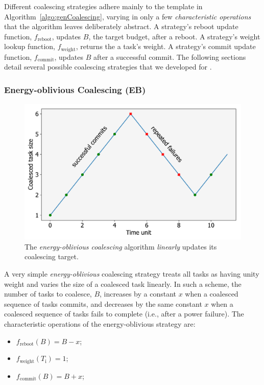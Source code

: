 Different coalescing strategies adhere mainly to the template in
Algorithm~\ref{algo:genCoalescing}, varying in only a few {\em characteristic
operations} that the algorithm leaves deliberately abstract.  A strategy's
reboot update function, $f_\text{reboot}$, updates $B$, the target budget,
after a reboot. A strategy's weight lookup function, $f_\text{weight}$, returns
the a task's weight.  A strategy's commit update function, $f_\text{commit}$,
updates $B$ after a successful commit. The following sections detail several
possible coalescing strategies that we developed for \sys. 

\subsubsection{Energy-oblivious Coalescing (EB)}
\label{subsec:energyBlind}

\begin{figure}
	\centering
	\includegraphics[width=0.5\columnwidth]{figures/slowCoal}
	\caption{The {\em energy-oblivious coalescing} algorithm \emph{linearly} updates its coalescing target.}
	\label{fig:energyBlind}
\end{figure}

A very simple {\em energy-oblivious} coalescing strategy treats all tasks as
having unity weight and varies the size of a coalesced task linearly. In such a
scheme, the number of tasks to coalesce, $B$, increases by a constant $x$ when
a coalesced sequence of tasks commits, and decreases by the same constant $x$
when a coalesced sequence of tasks fails to complete (i.e., after a power
failure).  The characteristic operations of the energy-oblivious strategy are: 

\begin{itemize}
\item $f_\text{reboot}(B) = B - x $;
\item $f_\text{weight}(T_\text{i}) =  1$; 
\item $f_\text{commit}(B) = B + x$; 
\end{itemize}

